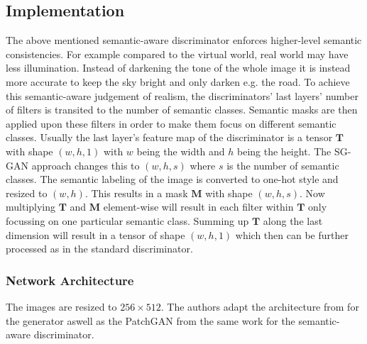 \subsection{Implementation}
The above mentioned semantic-aware discriminator enforces higher-level semantic consistencies. For example compared to the virtual world, real world may have less illumination. Instead of darkening the tone of the whole image it is instead more accurate to keep the sky bright and only darken e.g. the road. To achieve this semantic-aware judgement of realism, the discriminators' last layers' number of filters is transited to the number of semantic classes. Semantic masks are then applied upon these filters in order to make them focus on different semantic classes. Usually the last layer's feature map of the discriminator is a tensor $\mathbf{T}$ with shape $(w,h,1)$ with $w$ being the width and $h$ being the height. The SG-GAN approach changes this to $(w,h,s)$ where $s$ is the number of semantic classes. The semantic labeling of the image is converted to one-hot style and resized to $(w,h)$. This results in a mask $\mathbf{M}$ with shape $(w,h,s)$. Now multiplying $\mathbf{T}$ and $\mathbf{M}$ element-wise will result in each filter within $\mathbf{T}$ only focussing on one particular semantic class. Summing up $\mathbf{T}$ along the last dimension will result in a tensor of shape $(w,h,1)$ which then can be further processed as in the standard discriminator. 

\subsubsection{Network Architecture}
The images are resized to $256 \times 512$. The authors adapt the architecture from \cite{DBLP:journals/corr/IsolaZZE16} for the generator aswell as the PatchGAN from the same work for the semantic-aware discriminator. 


